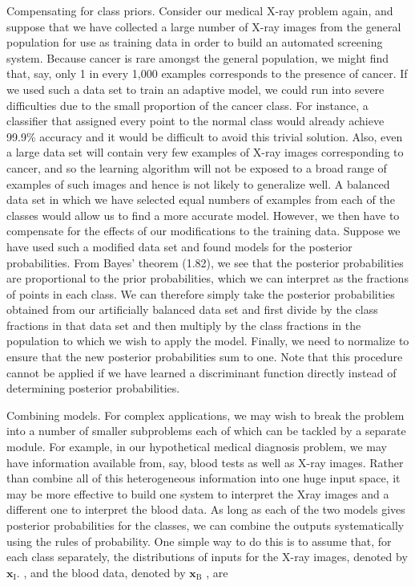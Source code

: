 \documentclass[
  10
]{article}
\begin{document}
Compensating for class priors. Consider our medical X-ray problem again,
and suppose that we have collected a large number of X-ray images from
the general population for use as training data in order to build an
automated screening system. Because cancer is rare amongst the general
population, we might find that, say, only 1 in every 1,000 examples
corresponds to the presence of cancer. If we used such a data set to
train an adaptive model, we could run into severe difficulties due to
the small proportion of the cancer class. For instance, a classifier
that assigned every point to the normal class would already achieve
99.9\% accuracy and it would be difficult to avoid this trivial
solution. Also, even a large data set will contain very few examples of
X-ray images corresponding to cancer, and so the learning algorithm will
not be exposed to a broad range of examples of such images and hence is
not likely to generalize well. A balanced data set in which we have
selected equal numbers of examples from each of the classes would allow
us to find a more accurate model. However, we then have to compensate
for the effects of our modifications to the training data. Suppose we
have used such a modified data set and found models for the posterior
probabilities. From Bayes' theorem (1.82), we see that the posterior
probabilities are proportional to the prior probabilities, which we can
interpret as the fractions of points in each class. We can therefore
simply take the posterior probabilities obtained from our artificially
balanced data set and first divide by the class fractions in that data
set and then multiply by the class fractions in the population to which
we wish to apply the model. Finally, we need to normalize to ensure that
the new posterior probabilities sum to one. Note that this procedure
cannot be applied if we have learned a discriminant function directly
instead of determining posterior probabilities.

Combining models. For complex applications, we may wish to break the
problem into a number of smaller subproblems each of which can be
tackled by a separate module. For example, in our hypothetical medical
diagnosis problem, we may have information available from, say, blood
tests as well as X-ray images. Rather than combine all of this
heterogeneous information into one huge input space, it may be more
effective to build one system to interpret the Xray images and a
different one to interpret the blood data. As long as each of the two
models gives posterior probabilities for the classes, we can combine the
outputs systematically using the rules of probability. One simple way to
do this is to assume that, for each class separately, the distributions
of inputs for the X-ray images, denoted by
\(\mathbf { x } _ { \mathrm { I } } .\) , and the blood data, denoted by
\(\mathbf { x } _ { \mathrm { B } }\) , are
\end{document}

